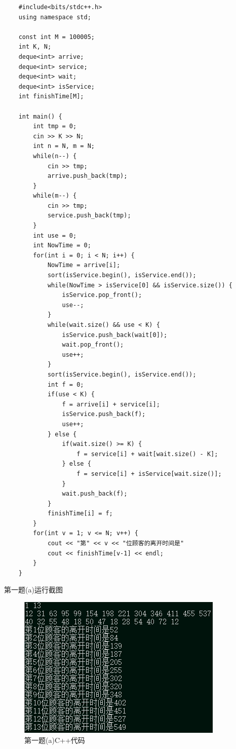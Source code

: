 \documentclass{book}
\begin{document}
\begin{lstlisting}
    #include<bits/stdc++.h>
    using namespace std;
    
    const int M = 100005;
    int K, N;
    deque<int> arrive;
    deque<int> service;
    deque<int> wait;
    deque<int> isService;
    int finishTime[M];
    
    int main() {
        int tmp = 0;
        cin >> K >> N;
        int n = N, m = N;
        while(n--) {
            cin >> tmp;
            arrive.push_back(tmp);
        }
        while(m--) {
            cin >> tmp;
            service.push_back(tmp);
        }
        int use = 0;
        int NowTime = 0;
        for(int i = 0; i < N; i++) {
            NowTime = arrive[i];
            sort(isService.begin(), isService.end());
            while(NowTime > isService[0] && isService.size()) {
                isService.pop_front();
                use--;
            }
            while(wait.size() && use < K) {
                isService.push_back(wait[0]);
                wait.pop_front();
                use++;
            }
            sort(isService.begin(), isService.end());
            int f = 0;
            if(use < K) {
                f = arrive[i] + service[i];
                isService.push_back(f);
                use++;
            } else {
                if(wait.size() >= K) {
                    f = service[i] + wait[wait.size() - K];
                } else {
                    f = service[i] + isService[wait.size()];
                }
                wait.push_back(f);
            }
            finishTime[i] = f;
        }
        for(int v = 1; v <= N; v++) {
            cout << "第" << v << "位顾客的离开时间是" 
            cout << finishTime[v-1] << endl; 
        }
    } 
\end{lstlisting}

第一题(a)运行截图
\begin{figure}[H]
    \centering
    \includegraphics*[]{gramFile/2(d)--1(a).png}
    \caption{第一题(a)C++代码}
\end{figure}
\end{document}
